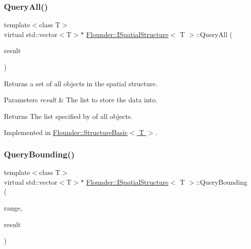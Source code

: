 \mbox{\label{class_flounder_1_1_i_spatial_structure_a973595818e65dfaf31fb8eaf79d5b6fd}} 
\subsubsection{\texorpdfstring{Query\+All()}{QueryAll()}}
{\footnotesize\ttfamily template$<$class T$>$ \\
virtual std\+::vector$<$T$>$$\ast$ \hyperlink{class_flounder_1_1_i_spatial_structure}{Flounder\+::\+I\+Spatial\+Structure}$<$ T $>$\+::Query\+All (\begin{DoxyParamCaption}\item[{std\+::vector$<$ T $>$ $\ast$}]{result }\end{DoxyParamCaption})\hspace{0.3cm}{\ttfamily [pure virtual]}}



Returns a set of all objects in the spatial structure. 


\begin{DoxyParams}{Parameters}
{\em result} & The list to store the data into. \\
\hline
\end{DoxyParams}
\begin{DoxyReturn}{Returns}
The list specified by of all objects. 
\end{DoxyReturn}


Implemented in \hyperlink{class_flounder_1_1_structure_basic_a1d85dcd21ad7547b1113eee8e6dc7b8e}{Flounder\+::\+Structure\+Basic$<$ T $>$}.

\mbox{\label{class_flounder_1_1_i_spatial_structure_a5059213aabb41bc892b9ec6bb6f996b2}} 
\subsubsection{\texorpdfstring{Query\+Bounding()}{QueryBounding()}}
{\footnotesize\ttfamily template$<$class T$>$ \\
virtual std\+::vector$<$T$>$$\ast$ \hyperlink{class_flounder_1_1_i_spatial_structure}{Flounder\+::\+I\+Spatial\+Structure}$<$ T $>$\+::Query\+Bounding (\begin{DoxyParamCaption}\item[{\hyperlink{class_flounder_1_1_i_collider}{I\+Collider} $\ast$}]{range,  }\item[{std\+::vector$<$ T $>$ $\ast$}]{result }\end{DoxyParamCaption})\hspace{0.3cm}{\ttfamily [pure virtual]}}



